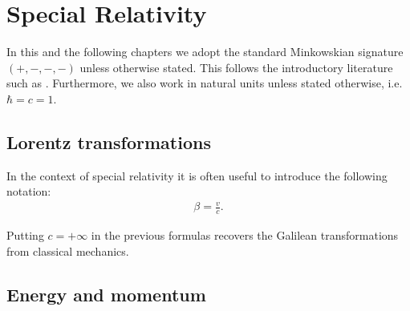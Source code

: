 \chapter{Special Relativity}

In this and the following chapters we adopt the standard Minkowskian signature $(+, -, -, -)$ unless otherwise stated. This follows the introductory literature such as \cite{Peskin, greiner_qft}. Furthermore, we also work in natural units unless stated otherwise, i.e. $\hbar = c = 1$.

\section{Lorentz transformations}

	\begin{notation}
		In the context of special relativity it is often useful to introduce the following notation:
		\begin{gather}
			\beta = \frac{v}{c}.
		\end{gather}
	\end{notation}
	\begin{remark}
		Putting $c=+\infty$ in the previous formulas recovers the Galilean transformations from classical mechanics.
	\end{remark}
    
\section{Energy and momentum}

